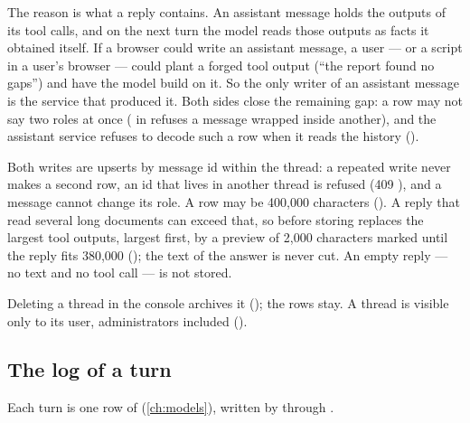The reason is what a reply contains. An assistant message holds the outputs of its tool calls,
and on the next turn the model reads those outputs as facts it obtained itself. If a browser
could write an assistant message, a user --- or a script in a user's browser --- could plant
a forged tool output (\enquote{the report found no gaps}) and have the model build on it. So
the only writer of an assistant message is the service that produced it. Both sides close the
remaining gap: a row may not say two roles at once ( in
 refuses a message wrapped inside another), and the assistant service
refuses to decode such a row when it reads the history ().

Both writes are upserts by message id within the thread: a repeated write never makes a
second row, an id that lives in another thread is refused (409 ), and a message cannot
change its role. A row may be 400,000 characters (). A reply that read
several long documents can exceed that, so before storing  replaces the
largest tool outputs, largest first, by a preview of 2,000 characters marked
 until the reply fits 380,000 (); the text of
the answer is never cut. An empty reply --- no text and no tool call --- is not stored.

Deleting a thread in the console archives it (); the rows stay. A thread is
visible only to its user, administrators included ().

\subsection{The log of a turn}

Each turn is one row of  (\cref{ch:models}), written by  through
.

